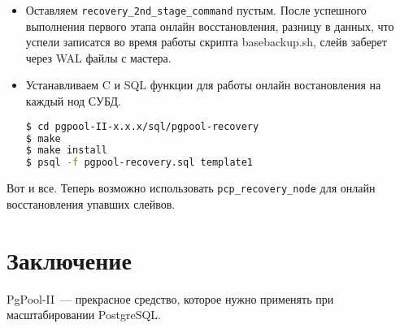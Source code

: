 \begin{itemize}
  \item Оставляем \lstinline!recovery_2nd_stage_command! пустым. После успешного выполнения первого этапа онлайн восстановления, разницу в данных, что успели записатся во время работы скрипта basebackup.sh, слейв заберет через WAL файлы с мастера.

  \item Устанавливаем C и SQL функции для работы онлайн востановления на каждый нод СУБД.

\begin{lstlisting}[language=Bash,label=lst:pgpool46,caption=Устанавливаем C и SQL функции]
$ cd pgpool-II-x.x.x/sql/pgpool-recovery
$ make
$ make install
$ psql -f pgpool-recovery.sql template1
\end{lstlisting}

\end{itemize}

Вот и все. Теперь возможно использовать \lstinline!pcp_recovery_node! для онлайн восстановления упавших слейвов.


\section{Заключение}

PgPool-II~--- прекрасное средство, которое нужно применять при масштабировании PostgreSQL.
